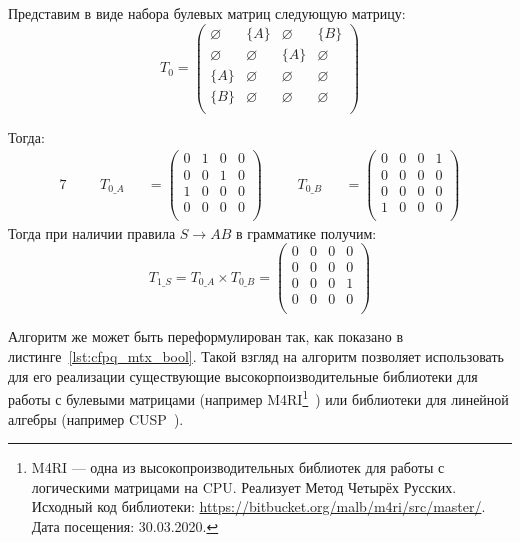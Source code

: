 \begin{example}
Представим в виде набора булевых матриц следующую матрицу:
\[
T_0 = \begin{pmatrix}
\varnothing & \{A\}       & \varnothing & \{B\}       \\
\varnothing & \varnothing & \{A\}       & \varnothing \\
\{A\}       & \varnothing & \varnothing & \varnothing \\
\{B\}       & \varnothing & \varnothing & \varnothing \\
\end{pmatrix}
\]

Тогда:
\begin{alignat*}{7}
& &&T_{0\_A} &&= \begin{pmatrix}
0 & 1       & 0 & 0       \\
0 & 0 & 1       & 0 \\
1  & 0 & 0 & 0       \\
0       & 0 & 0 & 0 \\
\end{pmatrix} \ \ \ \ &&T_{0\_B} &&= \begin{pmatrix}
0 & 0       & 0 & 1       \\
0       & 0 & 0       & 0 \\
0  & 0 & 0 & 0       \\
1       & 0 & 0 & 0 \\
\end{pmatrix}
\end{alignat*}
Тогда при наличии правила $S \to A B$ в грамматике получим:
\[
T_{1\_S} =T_{0\_A} \times T_{0\_B} = \begin{pmatrix}
0 & 0       & 0 & 0       \\
0       & 0 & 0       & 0 \\
0  & 0 & 0 & 1       \\
0       & 0 & 0 & 0 \\
\end{pmatrix}
\]
\end{example}

Алгоритм же может быть переформулирован так, как показано в листинге~\ref{lst:cfpq_mtx_bool}. Такой взгляд на алгоритм позволяет использовать для его реализации существующие высокорпоизводительные библиотеки для работы с булевыми матрицами (например M4RI\footnote{M4RI --- одна из высокопроизводительных библиотек для работы с логическими матрицами на CPU. Реализует Метод Четырёх Русских. Исходный код библиотеки: \url{https://bitbucket.org/malb/m4ri/src/master/}. Дата посещения: 30.03.2020.}~\cite{DBLP:journals/corr/abs-0811-1714}) или библиотеки для линейной алгебры (например CUSP~\cite{Cusp}).

